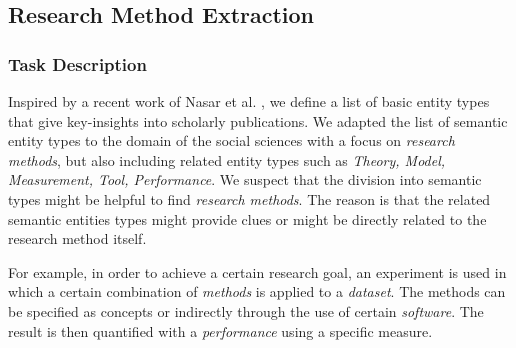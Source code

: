 \subsection{Research Method Extraction}
\label{sec:research_method_extraction}


\subsubsection{Task Description}
Inspired by a recent work of Nasar et al. \cite{nasar2018information}, we define a list of basic entity types that give key-insights into scholarly publications. 
We adapted the list of semantic entity types to the domain of the social sciences with a focus on \textit{research methods},
but also including related entity types such as \textit{Theory, Model, Measurement, Tool, Performance}. We suspect that the division into semantic types might be helpful to find \textit{research methods}.
The reason is that the related semantic entities types might provide clues or might be directly related to the research method itself.

For example, in order to achieve a certain research goal, an experiment is used in which a certain combination of \textit{methods} is applied to a \textit{dataset}.
The methods can be specified as concepts or indirectly through the use of certain \textit{software}.
The result is then quantified with a \textit{performance} using a specific measure.

